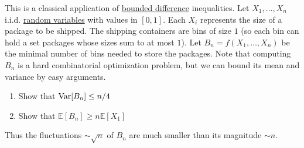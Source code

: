   \begin{exercise}
  This is a classical application of \hyperref[prob-thm:bounded-difference-inequality]{bounded difference} inequalities. Let $X_1, \ldots, X_n$ i.i.d. \hyperref[prob-def:random-variable]{random variables} with values in $[0, 1]$. Each $X_i$ represents the size of a package to be shipped. The shipping containers are bins of size $1$ (so each bin can hold a set packages whose sizes sum to at most $1$). Let $B_n = f(X_1, \ldots, X_n)$ be the minimal number of bins needed to store the packages. Note that computing $B_n$ is a hard combinatorial optimization problem, but we can bound its mean and variance by easy arguments. 
  \begin{enumerate}
      \item Show that $\operatorname{Var}[B_n] \leq n/4$
      \item Show that $\mathbb{E}[B_n] \geq n \mathbb{E}[X_1]$
  \end{enumerate}
  Thus the fluctuations $\sim \sqrt{n}$ of $B_n$ are much smaller than its magnitude $\sim n$. 
  \end{exercise}

